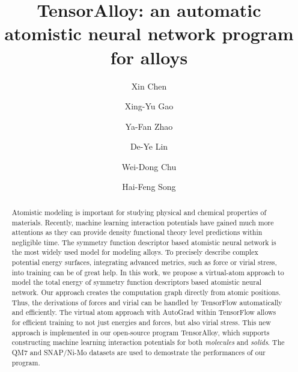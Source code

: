 \documentclass[final,1p,times]{elsarticle}
\begin{document}
\begin{frontmatter}



\title{TensorAlloy: an automatic atomistic neural network program for alloys}


\author[a]{Xin Chen}
\author[a]{Xing-Yu Gao}
\author[b,a]{Ya-Fan Zhao}
\author[b,a]{De-Ye Lin}
\author[a]{Wei-Dong Chu}
\author[a,b]{Hai-Feng Song}

\address[a]{Institute of Applied Physics and Computational Mathematics, 
Beijing 100088, China}
\address[b]{CAEP Software Center for High Performance Numerical Simulation, 
Beijing 100088, China}

\begin{abstract}
Atomistic modeling is important for studying physical and chemical properties of
materials. Recently, machine learning interaction potentials have gained much 
more attentions as they can provide density functional theory level predictions 
within negligible time. The symmetry function descriptor based 
atomistic neural network is the most widely used model for modeling alloys. 
To precisely describe complex potential energy surfaces, integrating advanced 
metrics, such as force or virial stress, into training can be of great help.  
In this work, we propose a virtual-atom approach to model the total energy of 
symmetry function descriptors based atomistic neural network. Our approach 
creates the computation graph directly from atomic positions. Thus, the 
derivations of forces and virial can be handled by TensorFlow automatically and 
efficiently. The virtual atom approach with AutoGrad within TensorFlow allows 
for efficient training to not just energies and forces, but also virial stress. 
This new approach is implemented in our open-source program TensorAlloy, which 
supports constructing machine learning interaction potentials for both 
\textit{molecules} and \textit{solids}. The QM7 and SNAP/Ni-Mo datasets are used 
to demostrate the performances of our program.
\end{abstract}


\end{frontmatter}
\end{document}
